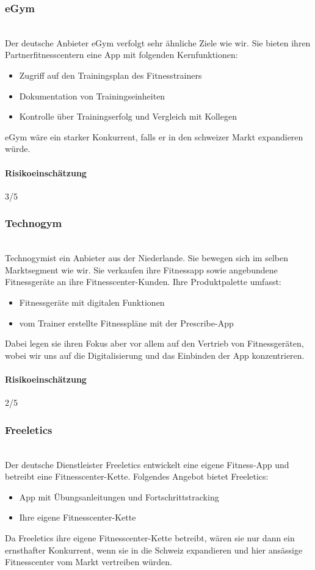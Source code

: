 \subsubsection{eGym}\hfill \\
Der deutsche Anbieter eGym\cite{egym} verfolgt sehr ähnliche Ziele wie wir. Sie bieten ihren Partnerfitnesscentern eine App mit folgenden Kernfunktionen:
\begin{itemize}
	\item Zugriff auf den Trainingsplan des Fitnesstrainers
	\item Dokumentation von Trainingseinheiten
	\item Kontrolle über Trainingserfolg und Vergleich mit Kollegen
\end{itemize}
eGym wäre ein starker Konkurrent, falls er in den schweizer Markt expandieren würde.
\paragraph{Risikoeinschätzung} \qquad {} 3/5
\subsubsection{Technogym}\hfill \\
Technogym\cite{technogym}ist ein Anbieter aus der Niederlande. Sie bewegen sich im selben Marktsegment wie wir. Sie verkaufen ihre Fitnessapp sowie angebundene Fitnessgeräte an ihre Fitnesscenter-Kunden.
Ihre Produktpalette umfasst:
\begin{itemize}
	\item Fitnessgeräte mit digitalen Funktionen
	\item vom Trainer erstellte Fitnesspläne mit der Prescribe-App
\end{itemize}
Dabei legen sie ihren Fokus aber vor allem auf den Vertrieb von Fitnessgeräten, wobei wir uns auf die Digitalisierung und das Einbinden der App konzentrieren.
\paragraph{Risikoeinschätzung} \qquad {} 2/5
\subsubsection{Freeletics}\hfill \\
Der deutsche Dienstleister Freeletics\cite{freeletics} entwickelt eine eigene Fitness-App und betreibt eine Fitnesscenter-Kette.
Folgendes Angebot bietet Freeletics:
\begin{itemize}
	\item App mit Übungsanleitungen und Fortschrittstracking
	\item Ihre eigene Fitnesscenter-Kette
\end{itemize}
Da Freeletics ihre eigene Fitnesscenter-Kette betreibt, wären sie nur dann ein ernsthafter Konkurrent, wenn sie in die Schweiz expandieren und hier ansässige Fitnesscenter vom Markt vertreiben würden.
